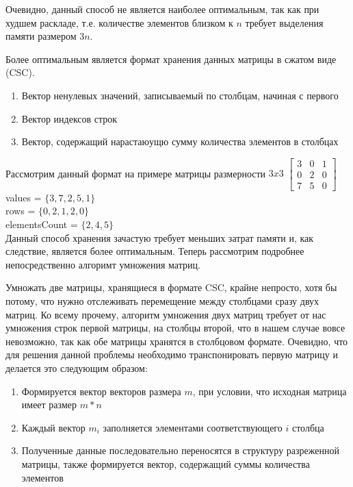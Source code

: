\documentclass[12pt]{article}
\begin{document}
Очевидно, данный способ не является наиболее оптимальным, так как при худшем раскладе, т.е. количестве элементов близком к $n$ требует выделения памяти размером $3n$.

Более оптимальным является формат хранения данных матрицы в сжатом виде (CSC). \begin{enumerate}
    \item Вектор ненулевых значений, записываемый по столбцам, начиная с первого
    \item Вектор индексов строк
    \item Вектор, содержащий нарастаюущю сумму количества элементов в столбцах
\end{enumerate}
Рассмотрим данный формат на примере матрицы размерности $3x3$
$\begin{bmatrix}
3 & 0 & 1\\
0 & 2 & 0\\
7 & 5 & 0
\end{bmatrix}$
values = $\lbrace 3, 7, 2, 5, 1\rbrace $\\
rows = $\lbrace 0, 2, 1, 2, 0 \rbrace $\\
elementsCount = $\lbrace 2, 4, 5 \rbrace $\\

Данный способ хранения зачастую требует меньших затрат памяти и, как следствие, является более оптимальным. Теперь рассмотрим подробнее непосредственно алгоримт умножения матриц.

Умножать две матрицы, хранящиеся в формате CSC, крайне непросто, хотя бы потому, что нужно отслеживать перемещение между столбцами сразу двух матриц. Ко всему прочему, алгоритм умножения двух матриц требует от нас умножения строк первой матрицы, на столбцы второй, что в нашем случае вовсе невозможно, так как обе матрицы хранятся в столбцовом формате. Очевидно, что для решения данной проблемы необходимо транспонировать первую матрицу и делается это следующим образом:

\begin{enumerate}
    \item Формируется вектор векторов размера $m$, при условии, что исходная матрица имеет размер $m*n$
    \item Каждый вектор $m_i$ заполняется элементами соответствующего $i$ столбца
    \item Полученные данные последовательно переносятся в структуру разреженной матрицы, также формируется вектор, содержащий суммы количества элементов
\end{enumerate}
\end{document}
